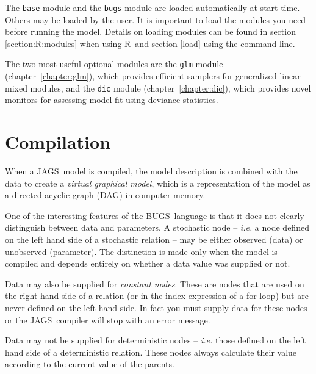 \documentclass[11pt, a4paper, titlepage]{report}
\newcommand{\JAGS}{\textsf{JAGS}}
\newcommand{\BUGS}{\textsf{BUGS}}
\newcommand{\R}{\textsf{R}}
\begin{document}
The \texttt{base} module and the \texttt{bugs} module are loaded
automatically at start time.  Others may be loaded by the user. It is
important to load the modules you need {\rm before} running the model.
Details on loading modules can be found in section \ref{section:R:modules}
when using \R\ and section \ref{load} using the command line.

The two most useful optional modules are the \texttt{glm} module
(chapter~\ref{chapter:glm}), which provides efficient samplers for
generalized linear mixed modules, and the \texttt{dic} module
(chapter~\ref{chapter:dic}), which provides novel monitors for
assessing model fit using deviance statistics.

\section{Compilation}

When a \JAGS\ model is compiled, the model description is combined
with the data to create a {\em virtual graphical model}, which is a
representation of the model as a directed acyclic graph (DAG) in
computer memory.%

One of the interesting features of the \BUGS\ language is that it does
not clearly distinguish between data and parameters.  A stochastic
node -- {\em i.e.} a node defined on the left hand side of a
stochastic relation -- may be either observed (data) or unobserved
(parameter). The distinction is made only when the model is compiled
and depends entirely on whether a data value was supplied or not.

Data may also be supplied for {\em constant nodes}. These are nodes
that are used on the right hand side of a relation (or in the index
expression of a for loop) but are never defined on the left hand
side. In fact you must supply data for these nodes or the
\JAGS\ compiler will stop with an error message.

Data may not be supplied for deterministic nodes -- {\em i.e.} those
defined on the left hand side of a deterministic relation. These nodes
always calculate their value according to the current value of the
parents. 
\end{document}
